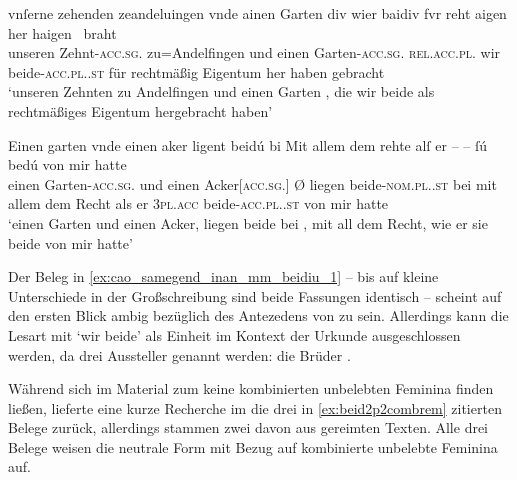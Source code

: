 \begin{exe}
\ex \label{ex:cao_samegend_inan_mm_beidiu}
	\begin{xlist}
	\ex \label{ex:cao_samegend_inan_mm_beidiu_1}
		\gll vnſerne zehenden zeandeluingen vnde ainen Garten
				\textelp{} div wier baidiv fvr reht aigen her
				haigen~ braht \\
			unseren Zehnt-\textsc{acc.sg}.\MascI{} zu=Andelfingen und einen
				Garten-\textsc{acc.sg.\MascI} {} \textsc{rel.acc.pl.\NeutI} wir
				beide-\textsc{acc.pl.\NeutI.st} für rechtmäßig Eigentum her haben
				gebracht \\
		\trans `unseren Zehnten zu Andelfingen und einen Garten \textelp{},
			die wir beide als recht\-mäßiges Eigentum hergebracht haben'
			\parencites(Nr.~1201~AB, Kl.~Heiligkreuztal, Kr.~Biberach, 1290)[472,10--18]{cao2}

	\ex \label{ex:cao_samegend_inan_mm_beidiu_2}
		\gll Einen garten vnde einen aker {}
				ligent beidú bi \textelp{} Mit allem dem rehte alſ er
				{-- --} ſú bedú von mir hatte \\
			einen Garten-\textsc{acc.sg.\MascI} und einen Acker[\textsc{acc.sg.\MascI}]
				Ø liegen beide-\textsc{nom.pl.\NeutI.st} bei {} mit allem dem
				Recht als er {} \textsc{3pl.acc} beide-\textsc{acc.pl.\NeutI.st} von mir
				hatte \\
		\trans `einen Garten und einen Acker,  liegen beide
			bei \textelp{}, mit all dem Recht, wie er sie beide von mir hatte'
			\parencites(Nr.~3249, Freiburg i.\,Br., 1299)[417,4--6]{cao4}
	\end{xlist}
\end{exe}

Der Beleg in \cref{ex:cao_samegend_inan_mm_beidiu_1} -- bis auf kleine
Unterschiede in der Großschreibung sind beide Fassungen identisch -- scheint
auf den ersten Blick ambig bezüglich des Antezedens von  zu sein.
Allerdings kann die Lesart mit  `wir beide' als Einheit
im Kontext der Urkunde ausgeschlossen werden, da drei Aussteller genannt
werden: die Brüder 
\autocites(Nr.~1201~AB)[472,7]{cao2}.

Während sich im Material zum \CAO{} keine kombinierten unbelebten Feminina
finden ließen, lieferte eine kurze Recherche im \REM{} die drei in
\cref{ex:beid2p2combrem} zitierten Belege zurück, allerdings stammen zwei davon
aus gereimten Texten. Alle drei Belege weisen die neutrale Form 
mit Bezug auf kombinierte unbelebte Feminina auf.

